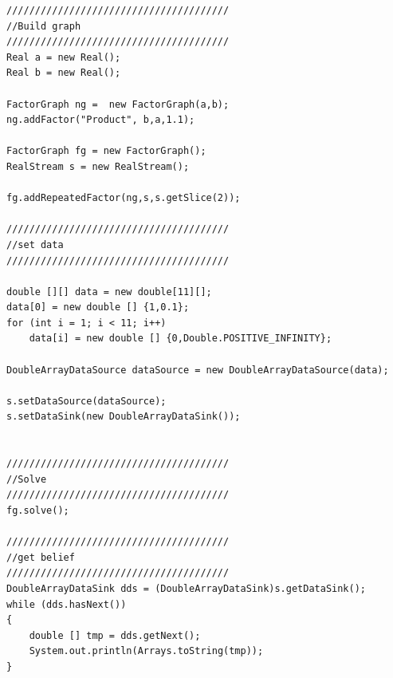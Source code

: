 \ifjava
\begin{lstlisting}
///////////////////////////////////////                                                                                                
//Build graph                                                                                                                  
///////////////////////////////////////                                                                                                
Real a = new Real();
Real b = new Real();

FactorGraph ng =  new FactorGraph(a,b);
ng.addFactor("Product", b,a,1.1);

FactorGraph fg = new FactorGraph();
RealStream s = new RealStream();

fg.addRepeatedFactor(ng,s,s.getSlice(2));

///////////////////////////////////////                                                                                                
//set data                                                                                                                     
/////////////////////////////////////// 

double [][] data = new double[11][];
data[0] = new double [] {1,0.1};
for (int i = 1; i < 11; i++)
	data[i] = new double [] {0,Double.POSITIVE_INFINITY};

DoubleArrayDataSource dataSource = new DoubleArrayDataSource(data);

s.setDataSource(dataSource);
s.setDataSink(new DoubleArrayDataSink());


///////////////////////////////////////                                                                                                
//Solve                                                                                                                        
///////////////////////////////////////                                                                                                
fg.solve();

///////////////////////////////////////                                                                                                
//get belief                                                                                                                        
///////////////////////////////////////
DoubleArrayDataSink dds = (DoubleArrayDataSink)s.getDataSink();
while (dds.hasNext())
{			
	double [] tmp = dds.getNext();
    System.out.println(Arrays.toString(tmp));
}
\end{lstlisting}
\fi

